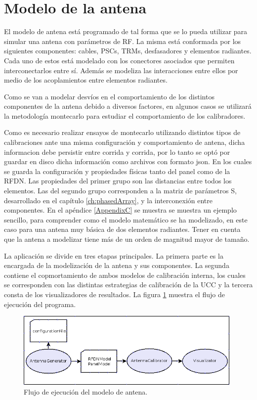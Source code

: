 \section{Modelo de la antena}

El modelo de antena está programado de tal forma que se lo pueda utilizar para simular una antena con parámetros de RF. La
misma está conformada por los siguientes componentes: cables, PSCs, TRMs, desfasadores y elementos radiantes. Cada uno de estos
está modelado con los conectores asociados que permiten interconectarlos entre sí. Además se modeliza las interacciones entre
ellos por medio de los acoplamientos entre elementos radiantes. 

Como se van a modelar desvíos en el comportamiento de los distintos componentes de la antena debido a diversos factores, en
algunos casos se utilizará la metodología montecarlo para estudiar el comportamiento de los calibradores.

Como es necesario realizar ensayos de montecarlo utilizando distintos tipos de calibraciones ante una misma configuración y 
comportamiento de antena, dicha informacion debe persistir entre corrida y corrida, por lo tanto se optó por guardar en disco
dicha información como archivos con formato json. En los cuales se guarda la configuración y propiedades físicas tanto del
panel como de la RFDN. Las propiedades del primer grupo son las distancias entre todos los elementos. Las del segundo grupo
corresponden a la matriz de parámetros S, desarrollado en el capítulo \ref{ch:phasedArray}, y la interconexión entre
componentes. En el apéndice \ref{AppendixC} se muestra se muestra un ejemplo sencillo, para comprender como el modelo
matemático se ha modelizado, en este caso para una antena muy básica de dos elementos radiantes. Tener en cuenta que la antena
a modelizar tiene más de un orden de magnitud mayor de tamaño.

La aplicación se divide en tres etapas principales. La primera parte es la encargada de la modelización de la antena y sus
componentes. La segunda contiene el copmortamiento de ambos modelos de calibración interna, los cuales se corresponden con las
distintas estrategias de calibración de la UCC y la tercera consta de los visualizadores de resultados. La figura
\ref{fig:prog_inic} muestra el flujo de ejecuci\'on del programa.

\begin{figure}
 \centering
 \includegraphics[width=11cm]{gfx/FlujoEjecucion.png}
 \caption{Flujo de ejecuci\'on del modelo de antena.}
 \label{fig:prog_inic}
\end{figure}

